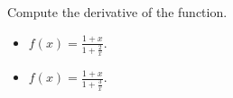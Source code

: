 Compute the derivative of the function.
\begin{itemize}
\item $f(x)=\frac{1+x }{1+\frac{2}x}$. 
\item $f(x)=\frac{1+x }{1+\frac{3}x}$. 
\end{itemize}
